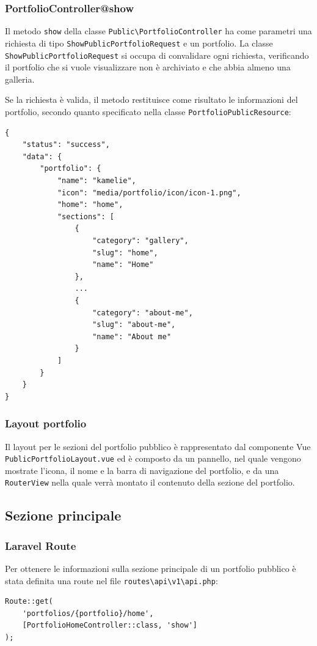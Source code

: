 \subsubsection{PortfolioController@show}
Il metodo \verb|show| della classe \verb|Public\PortfolioController| ha come parametri una richiesta di tipo \verb|ShowPublicPortfolioRequest| e un portfolio. La classe \verb|ShowPublicPortfolioRequest| si occupa di convalidare ogni richiesta, verificando il portfolio che si vuole visualizzare non \`e archiviato e che abbia almeno una galleria.

Se la richiesta \`e valida, il metodo restituisce come risultato le informazioni del portfolio, secondo quanto specificato nella classe \verb|PortfolioPublicResource|:
\begin{lstlisting}[caption={Risposta di successo portfolio pubblico}, label={lst:response_success_public_pf}]
{
	"status": "success",
	"data": {
		"portfolio": {
			"name": "kamelie",
			"icon": "media/portfolio/icon/icon-1.png",
			"home": "home",
			"sections": [
				{
					"category": "gallery",
					"slug": "home",
					"name": "Home"
				},
				...
				{
					"category": "about-me",
					"slug": "about-me",
					"name": "About me"
				}
			]
		}
	}
}
\end{lstlisting}

\subsubsection{Layout portfolio}
Il layout per le sezioni del portfolio pubblico \`e rappresentato dal componente Vue \verb|PublicPortfolioLayout.vue| ed \`e composto da un pannello, nel quale vengono mostrate l'icona, il nome e la barra di navigazione del portfolio, e da una \verb|RouterView| nella quale verr\`a montato il contenuto della sezione del portfolio.
\subsection{Sezione principale}
\subsubsection{Laravel Route}
Per ottenere le informazioni sulla sezione principale di un portfolio pubblico \`e stata definita una route nel file \verb|routes\api\v1\api.php|:
\begin{lstlisting}[caption={Route ottenere la sezione principale di un portfolio pubblico}, label={lst:route_public_portfolio_home}]
Route::get(
	'portfolios/{portfolio}/home',
	[PortfolioHomeController::class, 'show']
);
\end{lstlisting}

